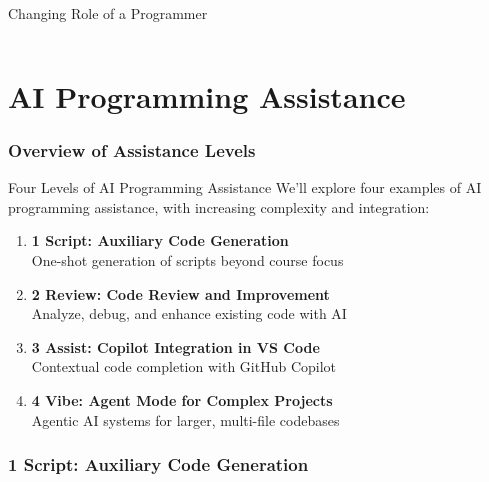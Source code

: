 \documentclass[xcolor={dvipsnames,table}, aspectratio=169]{beamer}
\newcommand{\footername}{AI in Programming Education}
\newcommand{\setfooter}[2]{\renewcommand{\footername}{\href{#2}{#1}}}
\begin{document}
\begin{frame}{Changing Role of a Programmer}
\begin{columns}
  \end{columns}
\end{frame}


\part[AI Programming Assistance]{AI Programming Assistance}
\section{Overview of Assistance Levels}
\setfooter{AI Programming Assistance}{https://github.com/neu-ece-esl/ai-prog-workshop}

\begin{frame}{Four Levels of AI Programming Assistance}
  We'll explore four examples of AI programming assistance, with increasing complexity and integration:
  
  \begin{enumerate}
    \item \textbf{1 Script: Auxiliary Code Generation}\\
    One-shot generation of scripts beyond course focus
    
    \item \textbf{2 Review: Code Review and Improvement}\\
    Analyze, debug, and enhance existing code with AI
    
    \item \textbf{3 Assist: Copilot Integration in VS Code}\\
    Contextual code completion with GitHub Copilot
    
    \item \textbf{4 Vibe: Agent Mode for Complex Projects}\\
    Agentic AI systems for larger, multi-file codebases
  \end{enumerate}
\end{frame}

\section{1 Script: Auxiliary Code Generation}
\setfooter{1 Script}{https://github.com/neu-ece-esl/ai-prog-workshop/tree/main/1-script}
\end{document}
